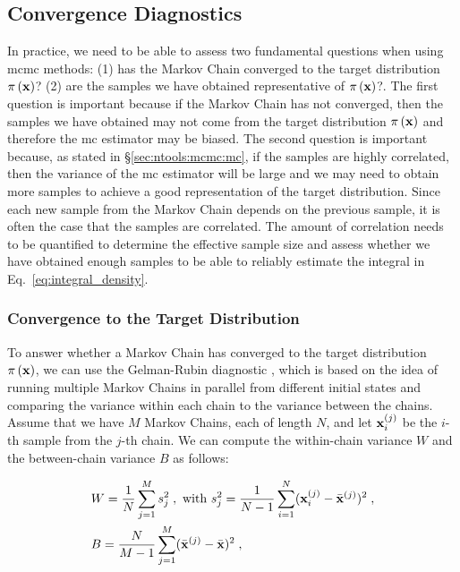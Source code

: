 \subsection{Convergence Diagnostics}
\label{sec:ntools:mcmc:convergence}

In practice, we need to be able to assess two fundamental questions when using \gls{mcmc} methods: (1) has the Markov Chain converged to the target distribution $\pi \left( \mathbf{x}\right)$? (2) are the samples we have obtained representative of $\pi \left( \mathbf{x}\right)$?. The first question is important because if the Markov Chain has not converged, then the samples we have obtained may not come from the target distribution $\pi \left( \mathbf{x}\right)$ and therefore the \gls{mc} estimator may be biased. The second question is important because, as stated in \S\ref{sec:ntools:mcmc:mc}, if the samples are highly correlated, then the variance of the \gls{mc} estimator will be large and we may need to obtain more samples to achieve a good representation of the target distribution. Since each new sample from the Markov Chain depends on the previous sample, it is often the case that the samples are correlated. The amount of correlation needs to be quantified to determine the effective sample size and assess whether we have obtained enough samples to be able to reliably estimate the integral in Eq.~\eqref{eq:integral_density}.

\smallskip
\subsubsection{Convergence to the Target Distribution}

To answer whether a Markov Chain has converged to the target distribution $\pi \left( \mathbf{x}\right)$, we can use the Gelman-Rubin diagnostic \cite{Gelman2013}, which is based on the idea of running multiple Markov Chains in parallel from different initial states and comparing the variance within each chain to the variance between the chains. Assume that we have $M$ Markov Chains, each of length $N$, and let $\mathbf{x}_{i}^{(j)}$ be the $i$-th sample from the $j$-th chain. We can compute the within-chain variance $W$ and the between-chain variance $B$ as follows:

\begin{equation}
  \begin{aligned}
    &W = \frac{1}{N} \sum_{j=1}^{M} s_j^2\;, \text{ with }s_j^2 = \frac{1}{N-1} \sum_{i=1}^N (\mathbf{x}_{i}^{(j)} - \bar{\mathbf{x}}^{(j)})^2\;,\\
    &B = \frac{N}{M-1} \sum_{j=1}^{M} (\bar{\mathbf{x}}^{(j)} - \bar{\mathbf{x}})^2\;,
  \end{aligned}
\end{equation}

